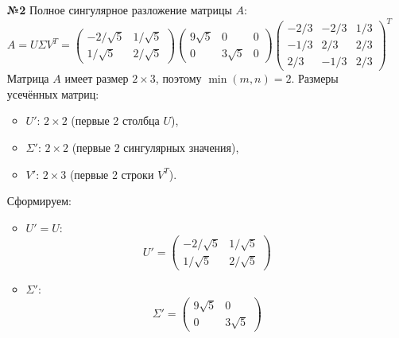 \documentclass[a4paper]{article}
\begin{document}
\begin{enumerate}
  \item[\textbf{№2}]Полное сингулярное разложение матрицы \( A \):  
  \[
  A = U \Sigma V^T = \begin{pmatrix}
  -2/\sqrt{5} & 1/\sqrt{5} \\
  1/\sqrt{5} & 2/\sqrt{5}
  \end{pmatrix} \begin{pmatrix}
  9\sqrt{5} & 0 & 0 \\
  0 & 3\sqrt{5} & 0
  \end{pmatrix} \begin{pmatrix}
  -2/3 & -2/3 & 1/3 \\
  -1/3 & 2/3 & 2/3 \\
  2/3 & -1/3 & 2/3
  \end{pmatrix}^T
  \]
  Матрица \( A \) имеет размер \( 2 \times 3 \), поэтому \( \min(m, n) = 2 \).  
  Размеры усечённых матриц:
  \begin{itemize}
    \item \( U' \): \( 2 \times 2 \) (первые 2 столбца \( U \)),  
    \item \( \Sigma' \): \( 2 \times 2 \) (первые 2 сингулярных значения),
    \item \( V' \): \( 2 \times 3 \) (первые 2 строки \( V^T \)).
  \end{itemize}
  Сформируем:
  \begin{itemize}
    \item \( U' = U \):  
    \[
    U' = \begin{pmatrix}
    -2/\sqrt{5} & 1/\sqrt{5} \\
    1/\sqrt{5} & 2/\sqrt{5}
    \end{pmatrix}
    \]
    
    \item \( \Sigma' \):  
    \[
    \Sigma' = \begin{pmatrix}
    9\sqrt{5} & 0 \\
    0 & 3\sqrt{5}
    \end{pmatrix}
    \]


\end{itemize}
\end{enumerate}
\end{document}
